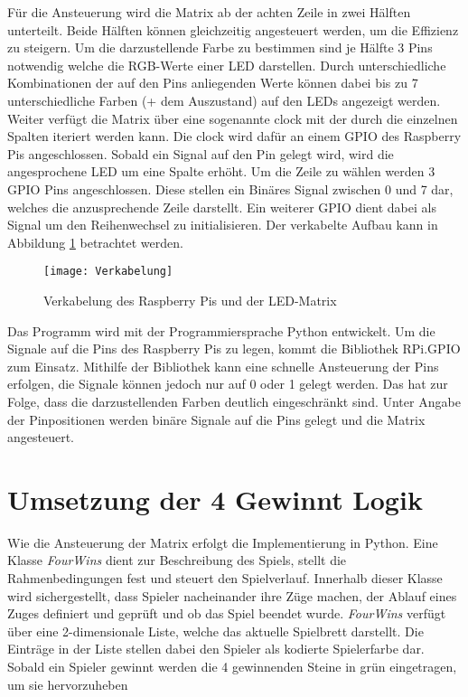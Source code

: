 Für die Ansteuerung wird die Matrix ab der achten Zeile in zwei Hälften unterteilt. Beide Hälften können gleichzeitig angesteuert werden, um die Effizienz zu steigern. Um die darzustellende Farbe zu bestimmen sind je Hälfte 3 Pins notwendig welche die RGB-Werte einer LED darstellen. Durch unterschiedliche Kombinationen der auf den Pins anliegenden Werte können dabei bis zu 7 unterschiedliche Farben (+ dem Auszustand) auf den LEDs angezeigt werden. Weiter verfügt die Matrix über eine sogenannte \glqq clock \grqq{} mit der durch die einzelnen Spalten iteriert werden kann. Die \glqq clock \grqq{} wird dafür an einem GPIO des Raspberry Pis angeschlossen. Sobald ein Signal auf den Pin gelegt wird, wird die angesprochene LED um eine Spalte erhöht. Um die Zeile zu wählen werden 3 GPIO Pins angeschlossen. Diese stellen ein Binäres Signal zwischen 0 und 7 dar, welches die anzusprechende Zeile darstellt. Ein weiterer GPIO dient dabei als Signal um den Reihenwechsel zu initialisieren. Der verkabelte Aufbau kann in Abbildung \ref{verkabelung} betrachtet werden.

\begin{figure}[!hbt]
	\centering
	\texttt{[image: Verkabelung]}
	\caption{Verkabelung des Raspberry Pis und der LED-Matrix}
	\label{verkabelung}
\end{figure}

Das Programm wird mit der Programmiersprache Python entwickelt. Um die Signale auf die Pins des Raspberry Pis zu legen, kommt die Bibliothek RPi.GPIO zum Einsatz. Mithilfe der Bibliothek kann eine schnelle Ansteuerung der Pins erfolgen, die Signale können jedoch nur auf 0 oder 1 gelegt werden. Das hat zur Folge, dass die darzustellenden Farben deutlich eingeschränkt sind. Unter Angabe der Pinpositionen werden binäre Signale auf die Pins gelegt und die Matrix angesteuert.

\section{Umsetzung der 4 Gewinnt Logik}
Wie die Ansteuerung der Matrix erfolgt die Implementierung in Python. Eine Klasse \textit{FourWins} dient zur Beschreibung des Spiels, stellt die Rahmenbedingungen fest und steuert den Spielverlauf. Innerhalb dieser Klasse wird sichergestellt, dass Spieler nacheinander ihre Züge machen, der Ablauf eines Zuges definiert und geprüft und ob das Spiel beendet wurde. \textit{FourWins} verfügt über eine 2-dimensionale Liste, welche das aktuelle Spielbrett darstellt. Die Einträge in der Liste stellen dabei den Spieler als kodierte Spielerfarbe dar. Sobald ein Spieler gewinnt werden die 4 gewinnenden Steine in grün eingetragen, um sie hervorzuheben

